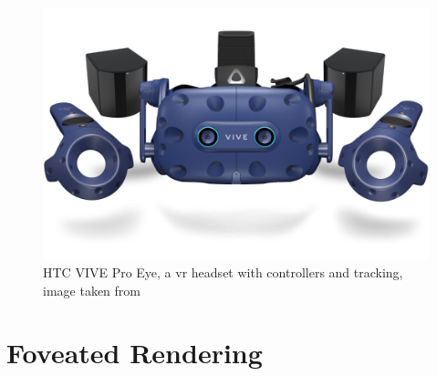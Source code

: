 \begin{figure}[t]
    \includegraphics[width=\textwidth,height=\textheight,keepaspectratio]{logos/viveproeye.png}
     \caption{HTC VIVE Pro Eye, a \acrshort{vr} headset with controllers and tracking, image taken from \cite{HTCVIVEProEye2020}}
    \label{fig:htcviveproeye}
\end{figure}

\section{Foveated Rendering}\label{section:background_foveatedrendering}

